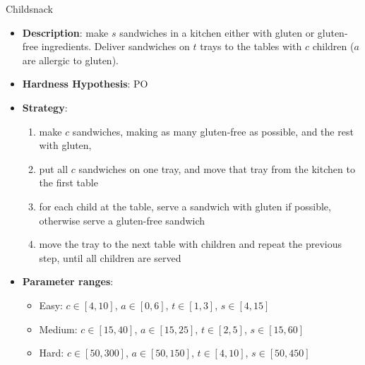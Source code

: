 \documentclass[aspectratio=169,xcolor=dvipsnames]{beamer}
\begin{document}
\begin{frame}{Childsnack}
    \begin{itemize}
        \item \textbf{Description}: make $s$ sandwiches in a kitchen either with gluten or gluten-free ingredients. Deliver sandwiches on $t$ trays to the tables with $c$ children ($a$ are allergic to gluten).
        \item \textbf{Hardness Hypothesis}: PO %
        \item \textbf{Strategy}:
        \begin{enumerate}
            \item make $c$ sandwiches, making as many gluten-free as possible, and the rest with gluten,
            \item put all $c$ sandwiches on one tray, and move that tray from the kitchen to the first table
            \item for each child at the table, serve a sandwich with gluten if possible, otherwise serve a gluten-free sandwich
            \item move the tray to the next table with children and repeat the previous step, until all children are served
        \end{enumerate}
        \item \textbf{Parameter ranges}:
        \begin{itemize}
            \item Easy: $c\in[4, 10]$, $a\in[0, 6]$, $t\in[1, 3]$, $s\in[4, 15]$
            \item Medium: $c\in[15, 40]$, $a\in[15, 25]$, $t\in[2, 5]$, $s\in[15, 60]$
            \item Hard: $c\in[50, 300]$, $a\in[50, 150]$, $t\in[4, 10]$, $s\in[50, 450]$
        \end{itemize}
    \end{itemize}
\end{frame}
\end{document}

